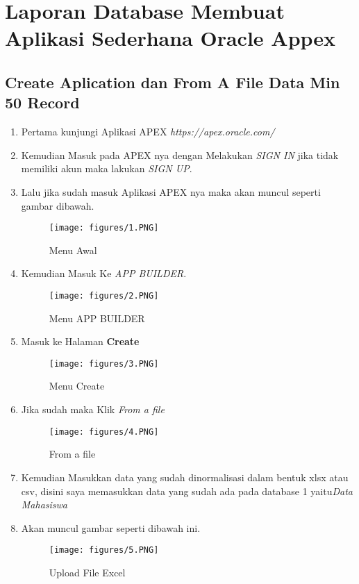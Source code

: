 \chapter{Laporan Database Membuat Aplikasi Sederhana Oracle Appex}
\section{Create Aplication dan From A File Data Min 50 Record}
\par
\begin{enumerate}
    \item Pertama kunjungi Aplikasi APEX \textit{https://apex.oracle.com/} 
    \item Kemudian Masuk pada APEX nya dengan Melakukan \textit{SIGN IN} jika tidak memiliki akun maka lakukan \textit{SIGN UP}.
    \item Lalu jika sudah masuk Aplikasi APEX nya maka akan muncul seperti gambar dibawah.
    \begin{figure}[!htbp]
\centering
\texttt{[image: figures/1.PNG]}
\caption{Menu Awal}
\label{penanda}
\end{figure}
    \item Kemudian Masuk Ke \textit{APP BUILDER}.
\begin{figure}[!htbp]
\centering
\texttt{[image: figures/2.PNG]}
\caption{Menu APP BUILDER}
\label{penanda}
\end{figure}
    \item Masuk ke Halaman \textbf{Create}
\begin{figure}[!htbp]
\centering
\texttt{[image: figures/3.PNG]}
\caption{Menu Create}
\label{penanda}
\end{figure}
    \item Jika sudah maka Klik \textit{From a file}
\begin{figure}[!htbp]
\centering
\texttt{[image: figures/4.PNG]}
\caption{From a file}
\label{penanda}
\end{figure}
\item Kemudian Masukkan data yang sudah dinormalisasi dalam bentuk xlsx atau csv, disini saya memasukkan data yang sudah ada pada database 1 yaitu\textit{Data Mahasiswa} 
\item Akan muncul gambar seperti dibawah ini.
\begin{figure}[!htbp]
\centering
\texttt{[image: figures/5.PNG]}
\caption{Upload File Excel}
\label{penanda}
\end{figure}

\end{enumerate}
